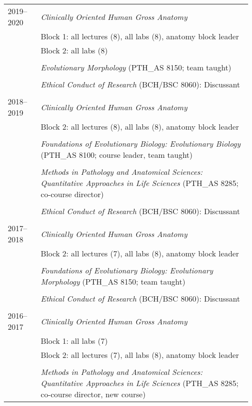 \begin{longtable}{@{}lX@{}}
  2019--2020 & \textit{Clinically Oriented Human Gross Anatomy}\\
  & Block 1: all lectures (8), all labs (8), anatomy block leader\\
  & Block 2: all labs (8)\\
  \\
  & \textit{Evolutionary Morphology} (PTH\_AS 8150; team taught)\\
  \\
  & \textit{Ethical Conduct of Research} (BCH/BSC 8060): Discussant\\
  \\
  2018--2019 & \textit{Clinically Oriented Human Gross Anatomy}\\
  & Block 2: all lectures (8), all labs (8), anatomy block leader\\
  \\
  & \textit{Foundations of Evolutionary Biology: Evolutionary Biology} (PTH\_AS 8100; course leader, team taught)\\
  \\
  & \textit{Methods in Pathology and Anatomical Sciences: Quantitative Approaches in Life Sciences} (PTH\_AS 8285; co-course director)\\
  \\
  & \textit{Ethical Conduct of Research} (BCH/BSC 8060): Discussant\\
  \\
  2017--2018 & \textit{Clinically Oriented Human Gross Anatomy}\\
  & Block 2: all lectures (7), all labs (8), anatomy block leader\\
  \\
  & \textit{Foundations of Evolutionary Biology: Evolutionary Morphology} (PTH\_AS 8150; team taught)\\
  \\
  & \textit{Ethical Conduct of Research} (BCH/BSC 8060): Discussant\\
  \\
    2016--2017 & \textit{Clinically Oriented Human Gross Anatomy}\\
    & Block 1: all labs (7)\\
    & Block 2: all lectures (7), all labs (8), anatomy block leader\\
    \\
    & \textit{Methods in Pathology and Anatomical Sciences: Quantitative Approaches in Life Sciences} (PTH\_AS 8285; co-course director, new course)\\

\end{longtable}
